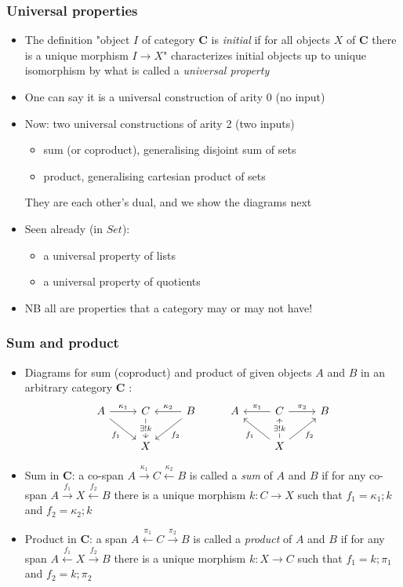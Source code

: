\documentclass[handout]{beamer}
\newcommand{\bfsf}[1]{{\boldsymbol{#1}}}
\newcommand{\CC}{\bfsf{C}}
\begin{document}
\frame
  {   
    \frametitle{Universal properties}\label{Ch4:UnivProp}

 \begin{itemize}[<+->]
\item The definition "object $I$ of category $\CC$ is \emph{initial}  
if for all objects $X$ of $\CC$ there is a unique morphism $I\to X$" characterizes  
initial objects up to unique isomorphism by what is called a \emph{universal property}
\item One can say it is a universal construction of arity  0 (no input)
\item Now: two universal constructions of arity 2 (two inputs)
\begin{itemize}
    \item sum (or coproduct), generalising disjoint sum of sets
    \item product, generalising cartesian product of sets
 \end{itemize}
They are each other's dual, and we show the diagrams next %
\item Seen already (in $Set$):
\begin{itemize}
    \item a universal property of lists
    \item a universal property of quotients
 \end{itemize}
\item NB all are properties that a category may or may not have!
\end{itemize}

 }

\frame
  {   
    \frametitle{Sum and product}\label{Ch4:SumProd}

 \begin{itemize}[<+->]
\item Diagrams for sum (coproduct) and product of given objects $A$ and $B$
in an arbitrary category $\CC$ :
\[
\begin{tikzcd}[ampersand replacement=\&]
A \arrow{r}{\kappa_1} \arrow[swap]{dr}{f_1}\&
C\arrow{d}[description]{\exists!k} \& 
B \arrow[swap]{l}{\kappa_2}\arrow{dl}{f_2} \&
A \&
C\arrow[swap]{l}{\pi_1} \arrow{r}{\pi_2}\&
B\\
\& X\&\& \&
X\arrow{ul}{f_1}\arrow{u}[description]{\exists!k} \arrow[swap]{ur}{f_2}
\end{tikzcd}
\]
\item Sum in $\CC$: a co-span $A\stackrel{\kappa_1}{\to} C \stackrel{\kappa_2}{\leftarrow}B$ 
is called a \emph{sum} of $A$ and $B$ 
if for any co-span 
$A\stackrel{f_1}{\to} X \stackrel{f_2}{\leftarrow}B$ 
there is a unique morphism $k: C\to X$
such that $f_1 = \kappa_1;k$ and $f_2 = \kappa_2;k$

\item Product in $\CC$: a span $A\stackrel{\pi_1}{\leftarrow} C \stackrel{\pi_2}{\to}B$ 
is called a \emph{product} of $A$ and $B$ if for any span 
$A\stackrel{f_1}{\leftarrow} X \stackrel{f_2}{\to}B$ 
there is a unique morphism $k: X\to C$
such that $f_1 = k;\pi_1$ and $f_2 = k;\pi_2$

 \end{itemize}

 }
\end{document}
